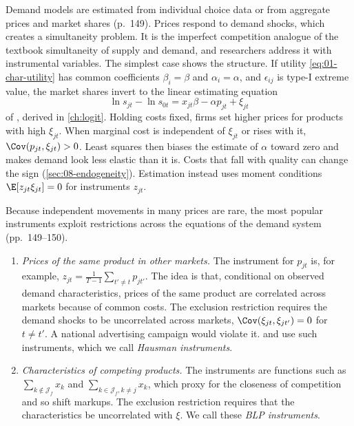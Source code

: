Demand models are estimated from individual choice data or from aggregate prices and market shares
(p.~149). Prices respond to demand shocks, which creates a simultaneity problem. It is the imperfect
competition analogue of the textbook simultaneity of supply and demand, and researchers address it with
instrumental variables. The simplest case shows the structure. If utility \eqref{eq:01-char-utility} has
common coefficients $\beta_i = \beta$ and $\alpha_i = \alpha$, and $\epsilon_{ij}$ is type-I extreme value,
the market shares invert to the linear estimating equation
\begin{equation}\label{eq:01-logit-inversion}
  \ln s_{jt} - \ln s_{0t} = x_{jt}\beta - \alpha p_{jt} + \xi_{jt}
\end{equation}
of \citet{Berry1994}, derived in \cref{ch:logit}. Holding costs fixed, firms set higher prices for products with
high $\xi_{jt}$. When marginal cost is independent of $\xi_{jt}$ or rises with it, $\Cov(p_{jt}, \xi_{jt}) > 0$.
Least squares then biases the estimate of $\alpha$ toward zero and makes demand look less elastic than it is.
Costs that fall with quality can change the sign (\cref{sec:08-endogeneity}). Estimation instead uses moment conditions $\E[z_{jt}\xi_{jt}] = 0$
for instruments $z_{jt}$.

Because independent movements in many prices are rare, the most popular instruments exploit restrictions
across the equations of the demand system (pp.~149--150).

\begin{enumerate}[label=(\alph*)]
  \item \emph{Prices of the same product in other markets.} The instrument for $p_{jt}$ is, for example,
        $z_{jt} = \frac{1}{T - 1}\sum_{t' \ne t} p_{jt'}$. The idea is that, conditional on observed demand
        characteristics, prices of the same product are correlated across markets because of common costs.
        The exclusion restriction requires the demand shocks to be uncorrelated across markets,
        $\Cov(\xi_{jt}, \xi_{jt'}) = 0$ for $t \ne t'$. A national advertising campaign would violate it.
        \citet{Hausman1997} and \citet{Nevo2001} use such instruments, which we call \emph{Hausman
        instruments}.
  \item \emph{Characteristics of competing products.} The instruments are functions such as
        $\sum_{k \notin \mathcal{J}_f} x_k$ and $\sum_{k \in \mathcal{J}_f, k \ne j} x_k$, which proxy for
        the closeness of competition and so shift markups. The exclusion restriction requires that the
        characteristics be uncorrelated with $\xi$. We call these \emph{BLP instruments}.
\end{enumerate}

